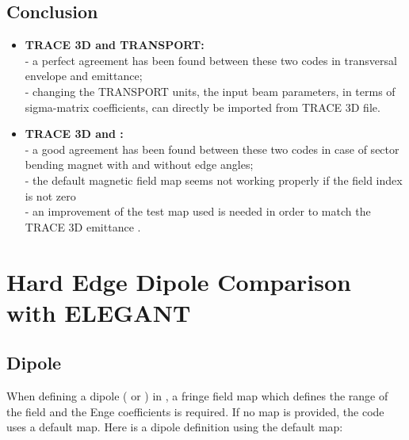 
\subsection{Conclusion}
\label{sec:conclusion}

\begin{itemize}

\item \textbf{TRACE 3D and TRANSPORT:} \\
- a perfect agreement has been found between these two codes in transversal envelope and emittance; \\
- changing the TRANSPORT units, the input beam parameters, in terms of sigma-matrix coefficients, can directly be imported from TRACE 3D file.

\item \textbf{TRACE 3D and \opalt:} \\
- a good agreement has been found between these two codes in case of sector bending magnet with and without edge angles;\\
- the default magnetic field map seems not working properly if the field index is not zero\\
- an improvement of the test map used is needed in order to match the TRACE 3D emittance .
\end{itemize}


\section{Hard Edge Dipole Comparison with ELEGANT}

\subsection{\opal Dipole}
When defining a dipole ( or ) in \opal,  a fringe field map which defines the range of the field and the Enge coefficients is required. If no map is provided, the code uses a default map. Here is a dipole definition using the default map:

